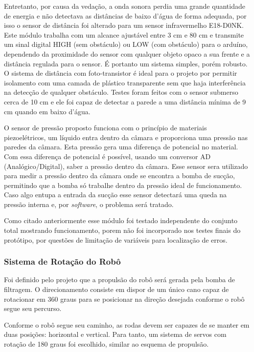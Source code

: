 Entretanto, por causa da vedação, a onda sonora perdia uma grande quantidade de energia e não detectava as distâncias de baixo d’água de forma adequada, por isso o sensor de distância foi alterado para um sensor infravermelho E18-D0NK. Este módulo trabalha com um alcance ajustável entre 3 cm e 80 cm e transmite um sinal digital HIGH (sem obstáculo) ou LOW (com obstáculo) para o arduíno, dependendo da proximidade do sensor com qualquer objeto opaco a sua frente e a distância regulada para o sensor. É portanto um sistema simples, porém robusto. O sistema de distância com foto-transistor é ideal para o projeto por permitir isolamento com uma camada de plástico transparente sem que haja interferência na detecção de qualquer obstáculo. Testes foram feitos com o sensor submerso cerca de 10 cm e ele foi capaz de detectar a parede a uma distância mínima de 9 cm quando em baixo d'água.

O sensor de pressão proposto funciona com o princípio de materiais piezoelétricos, um líquido entra dentro da câmara e proporciona uma pressão nas paredes da câmara. Esta pressão gera uma diferença de potencial no material. Com essa diferença de potencial é possível, usando um conversor AD (Analógico/Digital), saber a pressão dentro da câmara. Esse sensor sera utilizado para medir a pressão dentro da câmara onde se encontra a bomba de sucção, permitindo que a bomba só trabalhe dentro da pressão ideal de funcionamento. Caso algo entupa a entrada da sucção esse sensor detectará uma queda na pressão interna e, por \textit{software}, o problema será tratado.

Como citado anteriormente esse módulo foi testado independente do conjunto total mostrando funcionamento, porem não foi incorporado nos testes finais do protótipo, por questões de limitação de variáveis para localização de erros.

\subsubsection{Sistema de Rotação do Robô}
Foi definido pelo projeto que a propulsão do robô será gerada pela bomba de filtragem. O direcionamento consiste em dispor de um único cano capaz de rotacionar em 360 graus para se posicionar na direção desejada conforme o robô segue seu percurso.

Conforme o robô segue seu caminho, as rodas devem ser capazes de se manter em duas posições: horizontal e vertical. Para tanto, um sistema de servos com rotação de 180 graus foi escolhido, similar ao esquema de propulsão.

